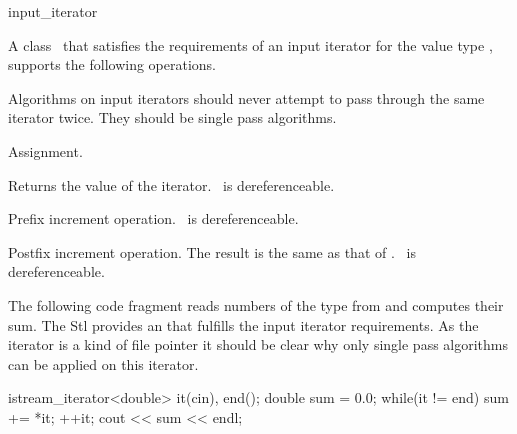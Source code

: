 \begin{ccClass}{input_iterator}



\ccDefinition

A class \ccClassName\ that satisfies the requirements of an input iterator
for the value type , supports the following operations.

Algorithms on input iterators should never attempt to pass through the
same iterator twice. They should be single pass algorithms.

\ccCreation
{}

{}

\ccOperations

{Assignment.}


{Returns the value of the iterator.
 \ccPrecond \ccVar\ is dereferenceable.}

{Prefix increment operation.
\ccPrecond \ccVar\ is dereferenceable.}

{Postfix increment operation. The result is the same as that of 
 .
\ccPrecond \ccVar\ is dereferenceable.}


\ccExample

The following code fragment reads numbers of the type 
from  and computes their sum. The {\sc Stl} provides an
 that fulfills the input iterator requirements.
As the iterator is a kind of file pointer it should be clear
why only single pass algorithms can be applied on this iterator.

\begin{cprog}
{
    istream_iterator<double> it(cin),
                             end();
    double sum = 0.0;
    while(it != end){
        sum += *it;
        ++it;
    }
    cout << sum << endl;
}
\end{cprog} 


\end{ccClass} 



